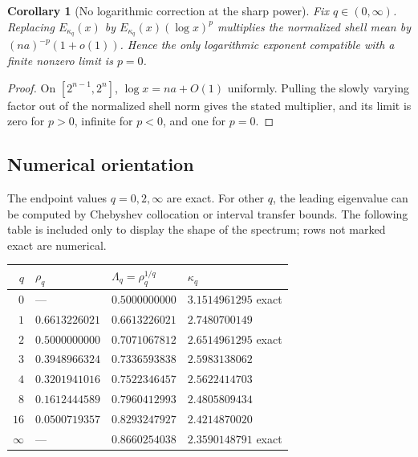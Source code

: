 \documentclass[11pt,oneside]{article}
\numberwithin{equation}{section}
\newtheorem{corollary}[theorem]{Corollary}
\theoremstyle{definition}
\theoremstyle{remark}
\begin{document}
\begin{corollary}[No logarithmic correction at the sharp power]
\label{cor:no-log-power}
Fix \(q\in(0,\infty)\).  Replacing \(E_{\kappa_q}(x)\) by
\(E_{\kappa_q}(x)(\log x)^p\) multiplies the normalized shell mean by
\((na)^{-p}(1+o(1))\).  Hence the only logarithmic exponent compatible with a finite
nonzero limit is \(p=0\).
\end{corollary}

\begin{proof}
On \([2^{n-1},2^n]\), \(\log x=na+O(1)\) uniformly.  Pulling the slowly varying factor
out of the normalized shell norm gives the stated multiplier, and its limit is zero for
\(p>0\), infinite for \(p<0\), and one for \(p=0\).
\end{proof}

\subsection{Numerical orientation}

The endpoint values \(q=0,2,\infty\) are exact.  For other \(q\), the leading eigenvalue
can be computed by Chebyshev collocation or interval transfer bounds.  The following table
is included only to display the shape of the spectrum; rows not marked exact are numerical.

\begin{center}
\begin{tabular}{@{}rlll@{}}
\toprule
\(q\) & \(\rho_q\) & \(\Lambda_q=\rho_q^{1/q}\) & \(\kappa_q\)\\
\midrule
\(0\) & --- & \(0.5000000000\) & \(3.1514961295\) \quad exact\\
\(1\) & \(0.6613226021\) & \(0.6613226021\) & \(2.7480700149\)\\
\(2\) & \(0.5000000000\) & \(0.7071067812\) & \(2.6514961295\) \quad exact\\
\(3\) & \(0.3948966324\) & \(0.7336593838\) & \(2.5983138062\)\\
\(4\) & \(0.3201941016\) & \(0.7522346457\) & \(2.5622414703\)\\
\(8\) & \(0.1612444589\) & \(0.7960412993\) & \(2.4805809434\)\\
\(16\) & \(0.0500719357\) & \(0.8293247927\) & \(2.4214870020\)\\
\(\infty\) & --- & \(0.8660254038\) & \(2.3590148791\) \quad exact\\
\bottomrule
\end{tabular}
\end{center}
\end{document}
